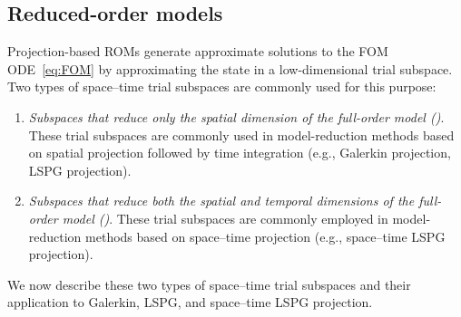 \documentclass[3p,computermodern,10pt]{elsarticle}
\begin{document}
\subsection{Reduced-order models}
Projection-based ROMs generate approximate solutions to the FOM
	ODE~\eqref{eq:FOM} by approximating the state in a low-dimensional trial
	subspace. Two types of space--time trial subspaces are commonly used for
	this purpose: 
\begin{enumerate} 
	\item \textit{Subspaces that reduce only the spatial dimension of the full-order
		model (\spatialAcronym)}. These 
	trial subspaces are commonly used
		in model-reduction methods based on spatial projection followed by time
		integration (e.g., Galerkin projection, LSPG projection).
	\item \textit{Subspaces that reduce both the spatial and temporal dimensions of the full-order
		model (\spaceTimeAcronym)}. These trial subspaces are commonly employed in
		model-reduction methods based on space--time projection (e.g., space--time
		LSPG projection).
\end{enumerate}
 We now describe these two types of space--time trial subspaces and their
	application to Galerkin, LSPG, and space--time LSPG projection. 
\end{document}
